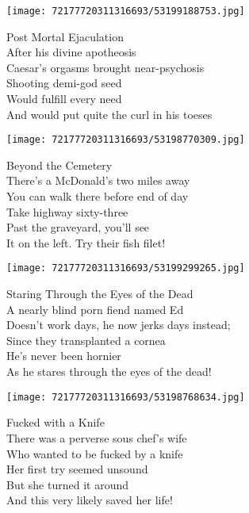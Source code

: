 \documentclass[10pt,letterpaper]{article}
\begin{document}
\begin{center}
\texttt{[image: 72177720311316693/53199188753.jpg]}
\end{center}

\begin{center}
Post Mortal Ejaculation\\
\vskip 0.2in
After his divine apotheosis\\
Caesar's orgasms brought near-psychosis\\
Shooting demi-god seed\\
Would fulfill every need\\
And would put quite the curl in his toeses\\
\end{center}
\pagebreak

\begin{center}\texttt{[image: 72177720311316693/53198770309.jpg]}
\end{center}
\begin{center}
Beyond the Cemetery\\
\vskip 0.2in
There's a McDonald's two miles away\\
You can walk there before end of day\\
Take highway sixty-three\\
Past the graveyard, you'll see\\
It on the left.  Try their fish filet!\\
\end{center}
\pagebreak

\begin{center}\texttt{[image: 72177720311316693/53199299265.jpg]}
\end{center}
\begin{center}
Staring Through the Eyes of the Dead\\
\vskip 0.2in
A nearly blind porn fiend named Ed\\
Doesn't work days, he now jerks days instead;\\
Since they transplanted a cornea\\
He's never been hornier\\
As he stares through the eyes of the dead!\\
\end{center}
\pagebreak

\begin{center}\texttt{[image: 72177720311316693/53198768634.jpg]}
\end{center}
\begin{center}
Fucked with a Knife\\
\vskip 0.2in
There was a perverse sous chef's wife\\
Who wanted to be fucked by a knife\\
Her first try seemed unsound\\
But she turned it around\\
And this very likely saved her life!\\
\end{center}
\pagebreak
\end{document}
